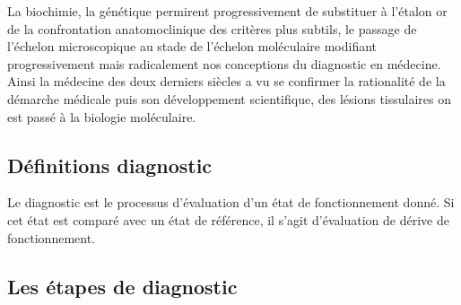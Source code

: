 La biochimie, la génétique permirent progressivement de substituer à l’étalon or de la confrontation anatomoclinique des critères plus subtils, le passage de l’échelon microscopique au stade de l’échelon moléculaire modifiant progressivement mais radicalement nos conceptions du diagnostic en médecine. Ainsi la médecine des deux derniers siècles a vu se confirmer la rationalité de la démarche médicale puis son développement scientifique, des lésions tissulaires on est passé à la biologie moléculaire.
\subsection{Définitions diagnostic}
Le diagnostic est le processus d'évaluation d'un état de fonctionnement donné. Si cet état est comparé avec un état de référence, il s'agit d'évaluation de dérive de fonctionnement. 
\subsection{Les étapes de diagnostic}

